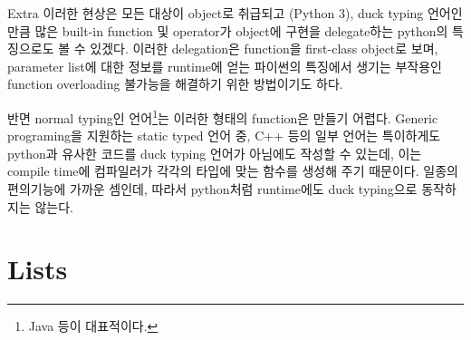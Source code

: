\documentclass[a4paper,11pt]{scrartcl}
\begin{document}
\begin{labeling}{Extra}
  이러한 현상은 모든 대상이 object로 취급되고 (Python 3), duck typing 언어인 만큼 많은 built-in function 및 operator가 object에 구현을 delegate하는 python의 특징으로도 볼 수 있겠다. 이러한 delegation은 function을 first-class object로 보며, parameter list에 대한 정보를 runtime에 얻는 파이썬의 특징에서 생기는 부작용인 function overloading 불가능을 해결하기 위한 방법이기도 하다.

  반면 normal typing인 언어\footnote{Java 등이 대표적이다.}는 이러한 형태의 function은 만들기 어렵다. Generic programing을 지원하는 static typed 언어 중, C++ 등의 일부 언어는 특이하게도 python과 유사한 코드를 duck typing 언어가 아님에도 작성할 수 있는데, 이는 compile time에 컴파일러가 각각의 타입에 맞는 함수를 생성해 주기 때문이다. 일종의 편의기능에 가까운 셈인데, 따라서 python처럼 runtime에도 duck typing으로 동작하지는 않는다.
\end{labeling}

\newpage
\setcounter{section}{3}
\section{Lists}
\end{document}
